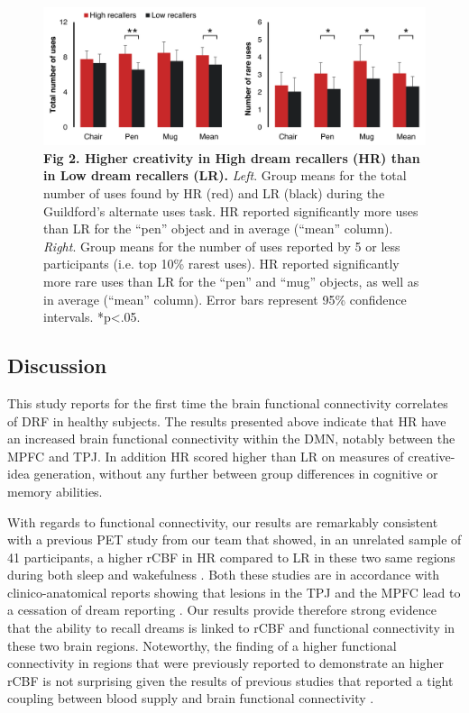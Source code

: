 \begin{figure}[!htbp]
	\includegraphics[width=\textwidth]{Fig/Results/Inertia/Creativity/Fig2.png}
	\caption*{\textbf{Fig 2. Higher creativity in High dream recallers (HR) than in Low dream recallers (LR).} \emph{Left}. Group means for the total number of uses found by HR (red) and LR (black) during the Guildford’s alternate uses task. HR reported significantly more uses than LR for the “pen” object and in average (“mean” column). \emph{Right}. Group means for the number of uses reported by 5 or less participants (i.e. top 10\% rarest uses). HR reported significantly more rare uses than LR for the “pen” and “mug” objects, as well as in average (“mean” column). Error bars represent 95\% confidence intervals. *p<.05.}
\end{figure}


\subsection*{Discussion}
\label{res:dmn-crea:discussion}

This study reports for the first time the brain functional connectivity correlates of DRF in healthy subjects. The results presented above indicate that HR have an increased brain functional connectivity within the DMN, notably between the MPFC and TPJ. In addition HR scored higher than LR on measures of creative-idea generation, without any further between group differences in cognitive or memory abilities.

With regards to functional connectivity, our results are remarkably consistent with a previous PET study from our team that showed, in an unrelated sample of 41 participants, a higher rCBF in HR compared to LR in these two same regions during both sleep and wakefulness \citep{eichenlaub_resting_2014}. Both these studies are in accordance with clinico-anatomical reports showing that lesions in the TPJ and the MPFC lead to a cessation of dream reporting \citep{solms_neuropsychology_1997}. Our results provide therefore strong evidence that the ability to recall dreams is linked to rCBF and functional connectivity in these two brain regions. Noteworthy, the finding of a higher functional connectivity in regions that were previously reported to demonstrate an higher rCBF is not surprising given the results of previous studies that reported a tight coupling between blood supply and brain functional connectivity \citep{liang_coupling_2013}.

